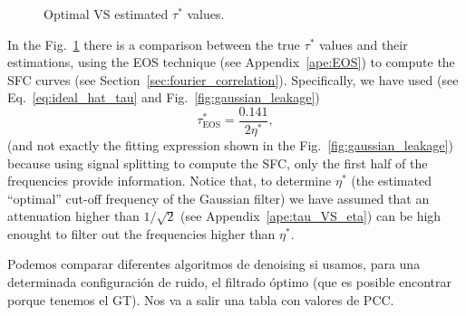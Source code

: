\documentclass{article}
\begin{document}
\begin{figure}
  \centering
  \caption{Optimal VS estimated $\tau^*$ values.\label{fig:tau_GF_estimation}}
\end{figure}

In the Fig.~\ref{fig:tau_GF_estimation} there is a comparison between
the true $\tau^*$ values and their estimations, using the EOS
technique (see Appendix~\ref{ape:EOS}) to compute the SFC curves (see
Section~\ref{sec:fourier_correlation}). Specifically, we have used
(see Eq.~\ref{eq:ideal_hat_tau} and Fig.~\ref{fig:gaussian_leakage})
\begin{equation}
  \tau^*_{\text{EOS}} = \frac{0.141}{2\eta^*},
  \label{eq:tau_VS_eta_empirical_EOS}
\end{equation}
(and not exactly the fitting expression shown in the
Fig.~\ref{fig:gaussian_leakage}) because using signal splitting to
compute the SFC, only the first half of the frequencies provide
information. Notice that, to determine $\eta^*$ (the estimated
``optimal'' cut-off frequency of the Gaussian filter) we have assumed
that an attenuation higher than $1/\sqrt{2}$ (see
Appendix~\ref{ape:tau_VS_eta}) can be high enought to filter out the
frequencies higher than $\eta^*$.

{\color{red} Podemos comparar diferentes algoritmos de denoising si usamos, para una determinada configuración de ruido, el filtrado óptimo (que es posible encontrar porque tenemos el GT). Nos va a salir una tabla con valores de PCC.}

\end{document}
